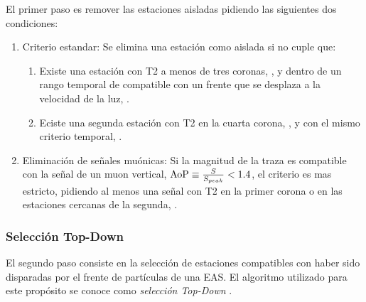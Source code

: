 	El primer paso es remover las estaciones aisladas pidiendo las siguientes dos condiciones:
	\begin{enumerate}
	 \item Criterio estandar: Se elimina una estación como aislada si no cuple que:
	 \begin{enumerate}
	  \item Existe una estación con T2 a menos de tres coronas, , y dentro de un rango temporal de compatible con un frente que se desplaza a la velocidad de la luz, .
	  \item Eciste una segunda estación con T2 en la cuarta corona, , y con el mismo criterio temporal, .
	 \end{enumerate}
	 \item Eliminación de señales muónicas: Si la magnitud de la traza es compatible con la señal de un muon vertical, ${\rm AoP} \equiv \frac{S}{S_{peak}}<1.4$, el criterio es mas estricto, pidiendo al menos una señal con T2 en la primer corona o en las estaciones cercanas de la segunda, .
	\end{enumerate}
	
	\subsubsection{Selección Top-Down} 
	
	El segundo paso consiste en la selección de estaciones compatibles con haber sido disparadas por el frente de partículas de una EAS.
	El algoritmo utilizado para este propósito se conoce como \emph{selección Top-Down} \cite{topDownSel}.
	
